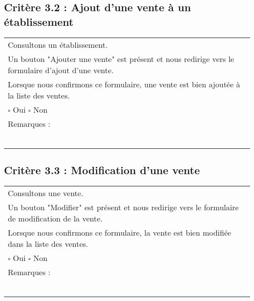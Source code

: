   		
\subsection*{Critère 3.2 : Ajout d'une vente à un établissement }
  		\begin{center}
    	 		\begin{tabular}[h]{|p{}|}
			\hline
				Consultons un établissement. \\
				Un bouton "Ajouter une vente" est présent et nous redirige vers le formulaire d'ajout d'une vente. \\
				Lorsque nous confirmons ce formulaire, une vente est bien ajoutée à la liste des ventes. \\
				
				$\square$ Oui  \hfill \hfill $\square$ Non \\\hline Remarques : \\ ~\\
			 \\\hline
     		\end{tabular}
  		\end{center}	
  		
  		
\subsection*{Critère 3.3 : Modification d'une vente }
  		\begin{center}
    	 		\begin{tabular}[h]{|p{}|}
			\hline
				Consultons une vente. \\
				Un bouton "Modifier" est présent et nous redirige vers le formulaire de modification de la vente. \\
				Lorsque nous confirmons ce formulaire, la vente est bien modifiée dans la liste des ventes. \\
				
				$\square$ Oui  \hfill \hfill $\square$ Non \\\hline Remarques : \\ ~\\
			 \\\hline
     		\end{tabular}
  		\end{center}	
